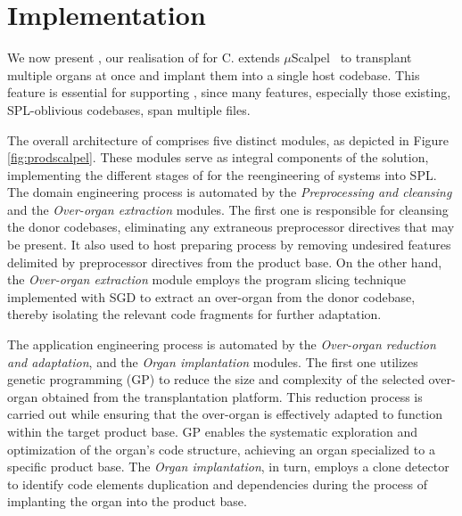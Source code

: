 \section{Implementation} 
\label{sec:implementation}

We now present \prodscalpel, our realisation of \FOUNDRY for C. \prodscalpel extends $\mu$Scalpel~\cite{Barr2015} to transplant multiple organs at once and implant them into a single host codebase. This feature is essential for supporting \FOUNDRY, since many features, especially those existing, SPL-oblivious codebases, span multiple files.


The overall architecture of \prodscalpel comprises five distinct modules, as depicted in Figure \ref{fig:prodscalpel}. These modules serve as integral components of the \prodscalpel solution, implementing the different stages of \FOUNDRY for the reengineering of systems into SPL. 
The domain engineering process is automated by the \textit{Preprocessing and cleansing} and the \textit{Over-organ extraction} modules. The first one is responsible for cleansing the donor codebases, eliminating any extraneous preprocessor directives that may be present. It also used to host preparing process by removing undesired features delimited by preprocessor directives from the product base. On the other hand, the \textit{Over-organ extraction} module employs the program slicing technique implemented with SGD to extract an over-organ from the donor codebase, thereby isolating the relevant code fragments for further adaptation.


The application engineering process is automated by the \textit{Over-organ reduction and adaptation}, and the \textit{Organ implantation} modules. The first one utilizes genetic programming (GP) to reduce the size and complexity of the selected over-organ obtained from the transplantation platform. This reduction process is carried out while ensuring that the over-organ is effectively adapted to function within the target product base. GP enables the systematic exploration and optimization of the organ's code structure, achieving an organ specialized to a specific product base. The \textit{Organ implantation}, in turn, employs a clone detector to identify code elements duplication and dependencies during the process of implanting the organ into the product base.

